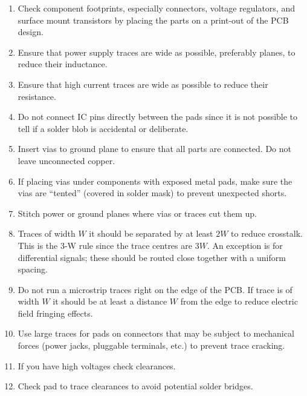 \begin{enumerate}
\item Check component footprints, especially connectors, voltage
  regulators, and surface mount transistors by placing the parts on a
  print-out of the PCB design.

\item Ensure that power supply traces are wide as possible, preferably
  planes, to reduce their inductance.

\item Ensure that high current traces are wide as possible to reduce
  their resistance.

\item Do not connect IC pins directly between the pads since it is not
  possible to tell if a solder blob is accidental or deliberate.

\item Insert vias to ground plane to ensure that all parts are
  connected.  Do not leave unconnected copper.


\item If placing vias under components with exposed metal pads, make
  sure the vias are ``tented'' (covered in solder mask) to prevent
  unexpected shorts.

\item Stitch power or ground planes where vias or traces cut them up.

\item Traces of width $W$ it should be separated by at least $2W$ to
  reduce crosstalk.  This is the 3-W rule since the trace centres are
  $3W$.  An exception is for differential signals; these should be
  routed close together with a uniform spacing.

\item Do not run a microstrip traces right on the edge of the PCB.  If
  trace is of width $W$ it should be at least a distance $W$ from the
  edge to reduce electric field fringing effects.

\item Use large traces for pads on connectors that may be subject to
  mechanical forces (power jacks, pluggable terminals, etc.) to
  prevent trace cracking.

\item If you have high voltages check clearances.

\item Check pad to trace clearances to avoid potential solder bridges.


\end{enumerate}
